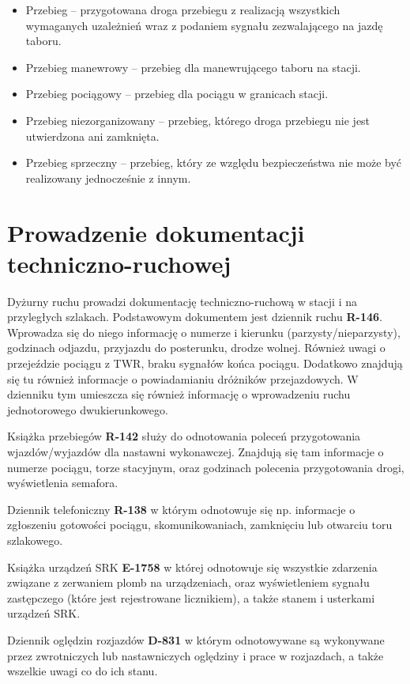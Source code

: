 \begin{itemize}
	\item Przebieg – przygotowana droga przebiegu z realizacją wszystkich wymaganych uzależnień wraz z podaniem sygnału zezwalającego na jazdę taboru.
	\item Przebieg manewrowy – przebieg dla manewrującego taboru na stacji.
	\item Przebieg pociągowy – przebieg dla pociągu w granicach stacji.
	\item Przebieg niezorganizowany – przebieg, którego droga przebiegu nie jest utwierdzona ani zamknięta.
	\item Przebieg sprzeczny – przebieg, który ze względu bezpieczeństwa nie może być realizowany jednocześnie z innym. 
\end{itemize}

\chapter{Prowadzenie dokumentacji techniczno-ruchowej}

Dyżurny ruchu prowadzi dokumentację techniczno-ruchową w stacji i na przyległych szlakach. 
Podstawowym dokumentem jest dziennik ruchu \textbf{R-146}. Wprowadza się do niego informację o numerze i kierunku (parzysty/nieparzysty), godzinach odjazdu, przyjazdu do posterunku, drodze wolnej. Również uwagi o przejeździe pociągu z TWR, braku sygnałów końca pociągu. Dodatkowo znajdują się tu również informacje o powiadamianiu dróżników przejazdowych. W dzienniku tym umieszcza się również informację o wprowadzeniu ruchu jednotorowego dwukierunkowego.

Książka przebiegów \textbf{R-142} służy do odnotowania poleceń przygotowania wjazdów/wyjazdów dla nastawni wykonawczej. Znajdują się tam informacje o numerze pociągu, torze stacyjnym, oraz godzinach polecenia przygotowania drogi, wyświetlenia semafora.

Dziennik telefoniczny \textbf{R-138} w którym odnotowuje się np. informacje o zgłoszeniu gotowości pociągu, skomunikowaniach, zamknięciu lub otwarciu toru szlakowego. 

Książka urządzeń SRK \textbf{E-1758} w której odnotowuje się wszystkie zdarzenia związane z zerwaniem plomb na urządzeniach, oraz wyświetleniem sygnału zastępczego (które jest rejestrowane licznikiem), a także stanem i usterkami urządzeń SRK. 

Dziennik oględzin rozjazdów \textbf{D-831} w którym odnotowywane są wykonywane przez zwrotniczych lub nastawniczych oględziny i prace w rozjazdach, a także wszelkie uwagi co do ich stanu.

